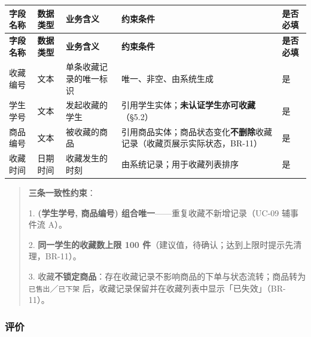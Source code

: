 \documentclass[12pt,a4paper]{ctexart}
\begin{document}
{\footnotesize
\begin{longtable}{|p{1.63cm}|p{1.63cm}|p{3.39cm}|p{7.71cm}|p{1.63cm}|}
\hline
\textbf{字段名称} & \textbf{数据类型} & \textbf{业务含义} & \textbf{约束条件} & \textbf{是否必填} \\
\hline
\endfirsthead
\hline
\textbf{字段名称} & \textbf{数据类型} & \textbf{业务含义} & \textbf{约束条件} & \textbf{是否必填} \\
\hline
\endhead
\hline
\endfoot
收藏编号 & 文本 & 单条收藏记录的唯一标识 & 唯一、非空、由系统生成 & 是 \\
\hline
学生学号 & 文本 & 发起收藏的学生 & 引用学生实体；\textbf{未认证学生亦可收藏}（§5.2） & 是 \\
\hline
商品编号 & 文本 & 被收藏的商品 & 引用商品实体；商品状态变化\textbf{不删除}收藏记录（收藏页展示实际状态，BR-11） & 是 \\
\hline
收藏时间 & 日期时间 & 收藏发生的时刻 & 由系统记录；用于收藏列表排序 & 是 \\
\hline
\end{longtable}
}


\begin{quote}\small
\textbf{三条一致性约束}：

1. \textbf{(学生学号, 商品编号) 组合唯一}——重复收藏不新增记录（UC-09 辅事件流 A）。

2. \textbf{同一学生的收藏数上限 100 件}（建议值，待确认；达到上限时提示先清理，BR-11）。

3. 收藏\textbf{不锁定商品}：存在收藏记录不影响商品的下单与状态流转；商品转为 \texttt{已售出}／\texttt{已下架} 后，收藏记录保留并在收藏列表中显示「已失效」（BR-11）。

\end{quote}

\subsubsection*{评价}
\end{document}
